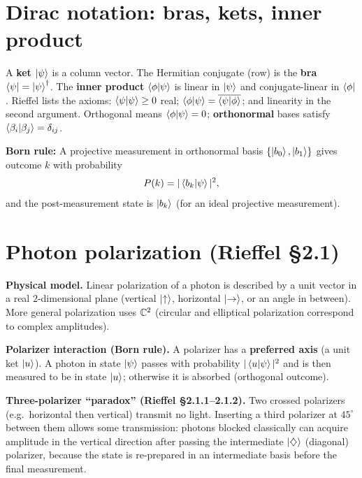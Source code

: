 \section{Dirac notation: bras, kets, inner product}

A \textbf{ket} $\left|\psi\right\rangle$ is a column vector. The Hermitian conjugate (row) is the \textbf{bra} $\left\langle\psi\right|=\left|\psi\right\rangle^\dagger$. The \textbf{inner product} $\left\langle\phi\middle|\psi\right\rangle$ is linear in $\left|\psi\right\rangle$ and conjugate-linear in $\left\langle\phi\right|$. Rieffel lists the axioms: $\left\langle\psi\middle|\psi\right\rangle\ge 0$ real; $\left\langle\phi\middle|\psi\right\rangle=\overline{\left\langle\psi\middle|\phi\right\rangle}$; and linearity in the second argument. Orthogonal means $\left\langle\phi\middle|\psi\right\rangle=0$; \textbf{orthonormal} bases satisfy $\left\langle\beta_i\middle|\beta_j\right\rangle=\delta_{ij}$.

\textbf{Born rule:} A projective measurement in orthonormal basis $\{\left|b_0\right\rangle,\left|b_1\right\rangle\}$ gives outcome $k$ with probability
\[
P(k)=|\left\langle b_k\middle|\psi\right\rangle|^2,
\]
and the post-measurement state is $\left|b_k\right\rangle$ (for an ideal projective measurement).

\section{Photon polarization (Rieffel \S2.1)}

\textbf{Physical model.} Linear polarization of a photon is described by a unit vector in a real $2$-dimensional plane (vertical $\left|\uparrow\right\rangle$, horizontal $\left|\rightarrow\right\rangle$, or an angle in between). More general polarization uses $\mathbb{C}^2$ (circular and elliptical polarization correspond to complex amplitudes).

\textbf{Polarizer interaction (Born rule).} A polarizer has a \textbf{preferred axis} (a unit ket $\left|u\right\rangle$). A photon in state $\left|\psi\right\rangle$ passes with probability $|\left\langle u\middle|\psi\right\rangle|^2$ and is then measured to be in state $\left|u\right\rangle$; otherwise it is absorbed (orthogonal outcome).

\textbf{Three-polarizer ``paradox'' (Rieffel \S2.1.1--2.1.2).} Two crossed polarizers (e.g.\ horizontal then vertical) transmit no light. Inserting a third polarizer at $45^\circ$ between them allows some transmission: photons blocked classically can acquire amplitude in the vertical direction after passing the intermediate $\left|\diamondsuit\right\rangle$ (diagonal) polarizer, because the state is re-prepared in an intermediate basis before the final measurement.

